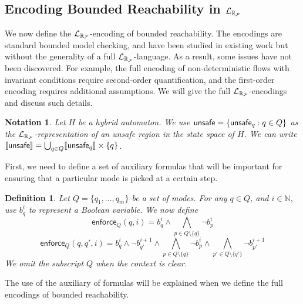 \documentclass[journal]{IEEEtran}
\newtheorem{definition}{Definition}
\newtheorem{notation}{Notation}
\newcommand{\enforce}{\mathsf{enforce}}
\begin{document}
\subsection{Encoding Bounded Reachability in $\mathcal{L}_{\mathbb{R}_{\mathcal{F}}}$}
We now define the $\mathcal{L}_{\mathbb{R}_{\mathcal{F}}}$-encoding of bounded reachability. The encodings are standard bounded model checking, and have been studied in existing work but without the generality of a full $\mathcal{L}_{\mathbb{R}_{\mathcal{F}}}$-language. As a result, some issues have not been discovered. For example, the full encoding of non-deterministic flows with invariant conditions require second-order quantification, and the first-order encoding requires additional assumptions. We will give the full $\mathcal{L}_{\mathbb{R}_{\mathcal{F}}}$-encodings and discuss such details.
\begin{notation}
Let $H$ be a hybrid automaton. We use $\mathsf{unsafe} = \{\mathsf{unsafe}_q:q\in Q\}$ as the $\mathcal{L}_{\mathbb{R}_{\mathcal{F}}}$-representation of an unsafe region in the state space of $H$. We can write $\llbracket \mathsf{unsafe}\rrbracket = \bigcup_{q\in Q} \llbracket \mathsf{unsafe}_q \rrbracket\times \{q\}$.
\end{notation}
First, we need to define a set of auxiliary formulas that will be important for ensuring that a particular mode is picked at a certain step.
\begin{definition}
Let $Q = \{q_1,...,q_m\}$ be a set of modes. For any $q\in Q$, and $i\in\mathbb{N}$, use  $b_{q}^i$ to represent a Boolean variable. We now define
$$\enforce_Q(q,i) = b^i_{q} \wedge \bigwedge_{p\in Q\setminus\{q\}}\neg b^{i}_{p}$$
$$\enforce_Q(q, q',i) = b^{i}_{q}\wedge \neg b^{i+1}_{q'} \wedge \bigwedge_{p\in Q\setminus\{q\}} \neg b^i_{p} \wedge \bigwedge_{p'\in Q\setminus\{q'\}} \neg b^{i+1}_{p'}$$
We omit the subscript $Q$ when the context is clear.\end{definition}
The use of the auxiliary of formulas will be explained when we define the full encodings of bounded reachability.
\end{document}
